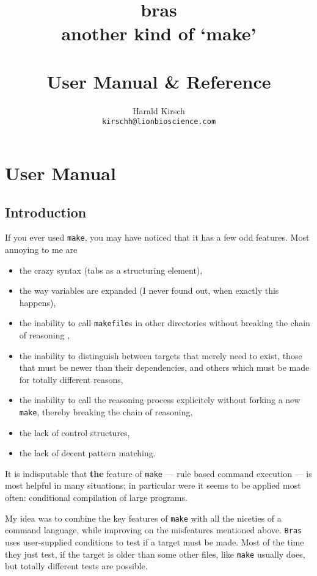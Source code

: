 \documentclass[11pt,bibtotoc,idxtotoc]{scrreprt}
\title{bras\\
another kind of `make'\\[2mm]
\raisebox{0.5\baselineskip}{\rule{4cm}{1pt}}\\
\LARGE\textsf{User Manual \& Reference}}
\author{\relax
Harald Kirsch\\
\texttt{kirschh@lionbioscience.com}
}
\newcommand{\Bras}{\texttt{Bras}}
\newcommand{\make}{\texttt{make}}
\newcommand{\makefile}{\texttt{makefile}}
\begin{document}
\maketitle
\tableofcontents

\chapter{User Manual}
\section{Introduction}
If you ever used \texttt{make}, you may have noticed that it has a few
odd features. Most annoying to me are

\begin{itemize}
\item 
the crazy syntax (tabs as a structuring element),
\item 
the way variables are expanded (I never found out, when exactly
this happens),
\item 
the inability to call \makefile{}s in other directories without
breaking the chain of reasoning \cite{Mil97},
\item the inability to distinguish between targets that merely need to
  exist, those that must be newer than their dependencies, and others
  which must be made for totally different reasons,
\item the inability to call the reasoning process explicitely without
  forking a new \make, thereby breaking the chain of reasoning,
\item the lack of control structures,
\item the lack of decent pattern matching.
\end{itemize}

It is indisputable that \textbf{the} feature of \texttt{make} ---
rule based command execution --- is most helpful in many situations;
in particular were it seems to be applied most often:
conditional compilation of large programs.

My idea was to combine the key features of \texttt{make} with all the
niceties of a command language, while improving on the misfeatures
mentioned above. \Bras{} uses user-supplied conditions to test if a
target must be made. Most of the time they just test, if the target is
older than some other files, like \make{} usually does, but totally
different tests are possible.
\end{document}
